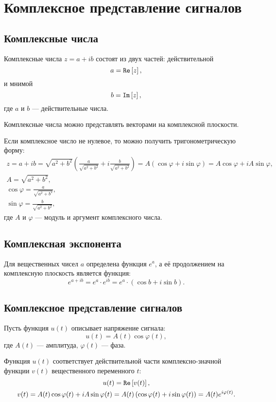 \chapter{Комплексное представление сигналов}


\section{Комплексные числа}

Комплексные числа $z = a + i b$ состоят из двух частей: действительной
\[
    a = \mathtt{Re} \left [ z \right ],
\]
и мнимой
\[
    b = \mathtt{Im} \left [ z \right ],
\]
где $a$ и $b$ --- действительные числа.

Комплексные числа можно представлять векторами на комплексной плоскости.

Если комплексное число не нулевое, то можно получить тригонометрическую форму:
\begin{gather*}
    z
    = a + i b
    = \sqrt{a^2 + b^2} \left ( \frac{a}{\sqrt{a^2 + b^2}} + i \frac{b}{\sqrt{a^2 + b^2}} \right )
    = A \left ( \cos \varphi + i \sin \varphi \right )
    = A \cos \varphi + i A \sin \varphi , \\
    A = \sqrt{a^2 + b^2} , \\
    \cos \varphi = \frac{a}{\sqrt{a^2 + b^2}} , \\
    \sin \varphi = \frac{b}{\sqrt{a^2 + b^2}} ,
\end{gather*}
где $A$ и $\varphi$ --- модуль и аргумент комплексного числа.


\section{Комплексная экспонента}

Для вещественных чисел $a$ определена функция $e^a$, а её продолжением на комплексную плоскость является функция:
\[
    e^{a + i b}
    = e^a \cdot e^{i b}
    = e^a \cdot \left ( \cos b + i \sin b \right ).
\]


\section{Комплексное представление сигналов}

Пусть функция $u(t)$ описывает напряжение сигнала:
\[
    u(t) = A(t) \cos \varphi(t) ,
\]
где $A(t)$ --- амплитуда, $\varphi(t)$ --- фаза.

Функция $u(t)$ соответствует действительной части комплексно-значной функции $v(t)$ вещественного переменного $t$:
\begin{gather*}
    u(t) = \mathtt{Re} \left [ v(t) \right ] , \\
    v(t)
    = A(t) \cos \varphi(t) + i A \sin \varphi(t)
    = A(t) \left ( \cos \varphi(t) + i \sin \varphi(t) \right )
    = A(t) e^{i \varphi(t)} .
\end{gather*}



